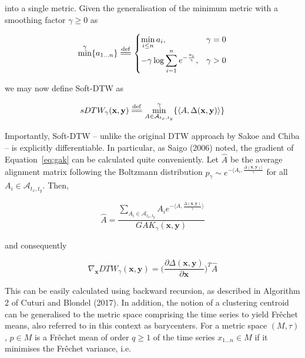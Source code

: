 \documentclass{article}
\newcommand{\eqdef}{\overset{\mathrm{def}}{=\joinrel=}}
\begin{document}
\noindent into a single metric.\cite{janati2020spatio} Given the generalisation of the minimum metric with a smoothing factor $\gamma \geq 0$ as

\begin{equation}
	\min^{\gamma} \{a_{1 \ldots n}\} \eqdef 
	\begin{cases}
		\displaystyle \min_{i \leq n} a_i, 								& \gamma = 0 \\
		- \gamma \log \displaystyle \sum_{i=1}^n e^{-\frac{a_i}{\gamma}},	& \gamma > 0
	\end{cases}
\end{equation}

\noindent we may now define Soft-DTW as

\begin{equation}
	sDTW_{\gamma}(\mathbf{x}, \mathbf{y}) \eqdef \min_{A \in \mathcal{A}_{t_x, t_y}} ^{\gamma} \{ \langle A, \Delta(\mathbf{x}, \mathbf{y}) \rangle \}
\end{equation}

Importantly, Soft-DTW -- unlike the original DTW approach by Sakoe and Chiba\cite{sakoe1978dynamic} -- is explicitly differentiable. In particular, as Saigo (2006) noted,\cite{saigo2006optimizing} the gradient of 
 Equation~\eqref{eq:gak} can be calculated quite conveniently. Let $\hat{A}$ be the average alignment matrix following the Boltzmann distribution $p_{\gamma} \sim e^{- \langle A_i, \frac{\Delta(\mathbf{x}, \mathbf{y}) \rangle}{\gamma}}$ for all $A_i \in \mathcal{A}_{t_x, t_y}$. Then, 
 
\begin{equation}
 	\hat{A} = \frac{\displaystyle \sum_{A_i \in \mathcal{A}_{t_x, t_y}} A_i e^{- \langle A, \frac{\Delta(\mathbf{x}, \mathbf{y})}{\gamma}\rangle}}{GAK_{\gamma}(\mathbf{x}, \mathbf{y})}
 \end{equation}

\noindent and consequently

\begin{equation}
	\nabla_{\mathbf{x}} DTW_{\gamma} (\mathbf{x}, \mathbf{y}) = \Bigg( \frac{\partial \Delta(\mathbf{x}, \mathbf{y})}{\partial \mathbf{x}} \Bigg)^T \hat{A}
\end{equation}

This can be easily calculated using backward recursion, as described in Algorithm 2 of Cuturi and Blondel (2017).\cite{cuturi2017soft} In addition, the notion of a clustering centroid can be generalised to the metric space comprising the time series to yield Fr\^{e}chet means, also referred to in this context as barycenters. For a metric space $(M, \tau)$, $p \in M$ is a Fr\^{e}chet mean of order $q \geq 1$ of the time series $x_{1 \ldots n} \in M$ if it minimises the Fr\^{e}chet variance, i.e.
\end{document}
